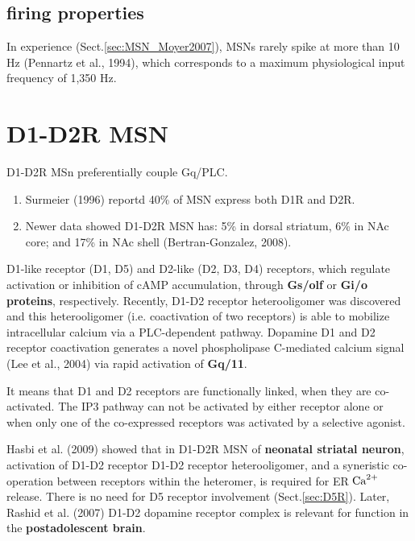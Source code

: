 \subsection{firing properties}

In \citep{moyer2007} experience (Sect.\ref{sec:MSN_Moyer2007}), MSNs rarely
spike at more than 10 Hz (Pennartz et al., 1994), which corresponds to a maximum
physiological input frequency of 1,350 Hz.



\section{D1-D2R MSN}
\label{sec:D1-D2-heteromer-MSN}

D1-D2R MSn preferentially couple Gq/PLC.

\begin{enumerate}
  \item  Surmeier (1996) reportd 40\% of MSN express both D1R and D2R.

   \item Newer data showed D1-D2R MSN has: 5\% in dorsal striatum, 6\% in NAc
 core; and 17\% in NAc shell (Bertran-Gonzalez, 2008).
   
\end{enumerate}

D1-like receptor (D1, D5) and D2-like (D2, D3, D4) receptors, which regulate
activation or inhibition of cAMP accumulation, through {\bf Gs/olf} or {\bf Gi/o
proteins}, respectively. Recently, D1-D2 receptor heterooligomer was discovered
and this heterooligomer (i.e. coactivation of two receptors) is able to mobilize
intracellular calcium via a PLC-dependent pathway. Dopamine D1 and D2 receptor
coactivation generates a novel phospholipase C-mediated calcium signal (Lee et
al., 2004) via rapid activation of {\bf Gq/11}.


It means that D1 and D2 receptors are functionally linked, when they are
co-activated. The IP3 pathway can not be activated by either receptor alone or
when only one of the co-expressed receptors was activated by a selective
agonist.

Hasbi et al. (2009) showed that in D1-D2R MSN of {\bf neonatal striatal neuron},
activation of D1-D2 receptor D1-D2 receptor heterooligomer, and a syneristic
co-operation between receptors within the heteromer, is required for ER ${\text{Ca}^{2+}}$
release. There is no need for D5 receptor involvement (Sect.\ref{sec:D5R}).
Later, Rashid et al. (2007) D1-D2 dopamine receptor complex is relevant for
function in the {\bf postadolescent brain}.


